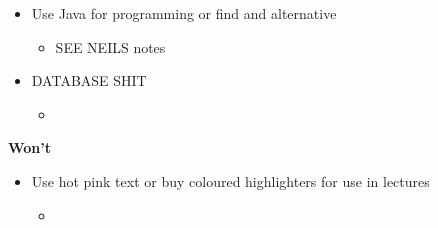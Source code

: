 \begin{itemize}
    \item Use Java for programming or find and alternative 
    \begin{itemize}
        \item SEE NEILS notes 
    \end{itemize}
    \item DATABASE SHIT
    \begin{itemize}
        \item 
    \end{itemize}
\end{itemize}
\textbf{Won't}

\begin{itemize}
    \item Use hot pink text or buy coloured highlighters for use in lectures
    \begin{itemize}
        \item 
    \end{itemize}
\end{itemize}